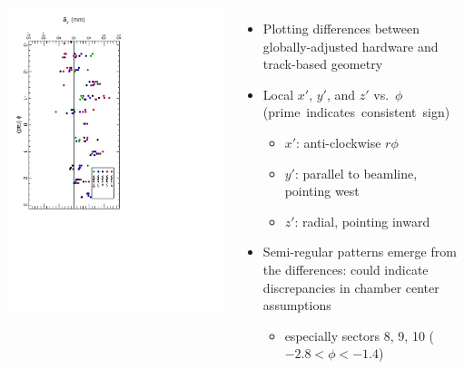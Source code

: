 \documentclass[compress]{beamer}
\begin{document}
\begin{frame}
\begin{columns}
\includegraphics[height=\linewidth, angle=90]{NOV4DT_vs_HARDWAREadjust_z.pdf}

\begin{itemize}
\item Plotting differences between globally-adjusted hardware and track-based geometry
\item Local $x'$, $y'$, and $z'$ vs.\ $\phi$ \mbox{(prime indicates consistent sign)\hspace{-1 cm}}
\begin{itemize}
\item $x'$: anti-clockwise $r\phi$
\item $y'$: parallel to beamline, pointing west
\item $z'$: radial, pointing inward
\end{itemize}
\item Semi-regular patterns emerge from the differences: could indicate discrepancies in chamber center assumptions
\begin{itemize}
\item especially sectors 8, 9, 10 ($-2.8 < \phi < -1.4$)
\end{itemize}
\end{itemize}
\end{columns}
\end{frame}
\end{document}
